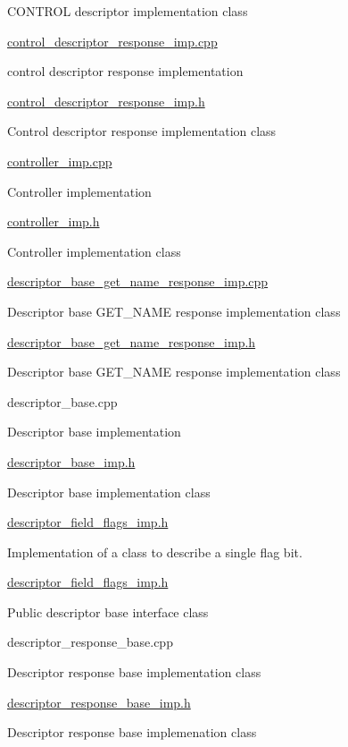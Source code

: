C\+O\+N\+T\+R\+OL descriptor implementation class

\hyperlink{control__descriptor__response__imp_8cpp}{control\+\_\+descriptor\+\_\+response\+\_\+imp.\+cpp}

control descriptor response implementation

\hyperlink{control__descriptor__response__imp_8h}{control\+\_\+descriptor\+\_\+response\+\_\+imp.\+h}

Control descriptor response implementation class

\hyperlink{controller__imp_8cpp}{controller\+\_\+imp.\+cpp}

Controller implementation

\hyperlink{controller__imp_8h}{controller\+\_\+imp.\+h}

Controller implementation class

\hyperlink{descriptor__base__get__name__response__imp_8cpp}{descriptor\+\_\+base\+\_\+get\+\_\+name\+\_\+response\+\_\+imp.\+cpp}

Descriptor base G\+E\+T\+\_\+\+N\+A\+ME response implementation class

\hyperlink{descriptor__base__get__name__response__imp_8h}{descriptor\+\_\+base\+\_\+get\+\_\+name\+\_\+response\+\_\+imp.\+h}

Descriptor base G\+E\+T\+\_\+\+N\+A\+ME response implementation class

descriptor\+\_\+base.\+cpp

Descriptor base implementation

\hyperlink{descriptor__base__imp_8h}{descriptor\+\_\+base\+\_\+imp.\+h}

Descriptor base implementation class

\hyperlink{descriptor__field__flags__imp_8h}{descriptor\+\_\+field\+\_\+flags\+\_\+imp.\+h}

Implementation of a class to describe a single flag bit.

\hyperlink{descriptor__field__flags__imp_8h}{descriptor\+\_\+field\+\_\+flags\+\_\+imp.\+h}

Public descriptor base interface class

descriptor\+\_\+response\+\_\+base.\+cpp

Descriptor response base implementation class

\hyperlink{descriptor__response__base__imp_8h}{descriptor\+\_\+response\+\_\+base\+\_\+imp.\+h}

Descriptor response base implemenation class

